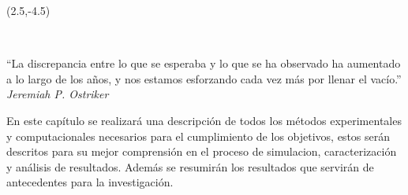 \begin{textblock}{9}(2.5,-4.5)
\begin{flushright}
\setlength{\baselineskip}{15pt}
~

``La discrepancia entre lo que se esperaba y lo que se ha observado ha aumentado a lo largo de los años, y nos estamos esforzando cada vez más por llenar el vacío.''\\[.5cm]
\textit{Jeremiah P. Ostriker}
\end{flushright}
\end{textblock}


En este capítulo se realizará una descripción de todos los métodos experimentales y computacionales necesarios para el cumplimiento de los objetivos, estos serán descritos para su mejor comprensión en el proceso de simulacion, caracterización y análisis de resultados. Además se resumirán los resultados que servirán de antecedentes para la investigación.